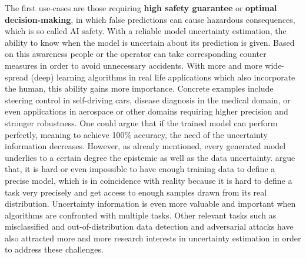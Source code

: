 The first use-cases are those requiring \textbf{high safety guarantee} or \textbf{optimal decision-making}, in which false predictions can cause hazardous consequences, which is so called AI safety\cite{amodei2016concrete}. With a reliable model uncertainty estimation, the ability to know when the model is uncertain about its prediction is given. Based on this awareness people or the operator can take corresponding counter measures in order to avoid unnecessary accidents. With more and more wide-spread (deep) learning algorithms in real life applications which also incorporate the human, this ability gains more importance. Concrete examples include steering control in self-driving cars\cite{mcallister2017concrete}, disease diagnosis in the medical domain\cite{leibig2017leveraging}, or even applications in aerospace or other domains requiring higher precision and stronger robustness. One could argue that if the trained model can perform perfectly, meaning to achieve 100\% accuracy, the need of the uncertainty information decreases. 
However, as already mentioned, every generated model underlies to a certain degree the epistemic as well as the data uncertainty.
\cite{denker1991transforming} argue that, it is  
hard or even impossible to have enough training data to define a precise  model, which is in coincidence with reality because it is hard to define a task very precisely and get access to enough samples drawn from its real distribution. 
Uncertainty information is even more valuable and important when algorithms are confronted with multiple tasks\cite{kendall2017multi}. Other relevant tasks such as misclassified 
and out-of-distribution data detection\cite{hendrycks2016baseline} and adversarial attacks \cite{kurakin2016adversarial, feinman2017detecting} 
 
have also attracted more and more research interests in uncertainty estimation in order to address these challenges.

